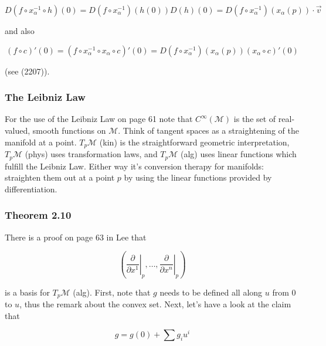 \documentclass[12pt]{article}
\begin{document}
\begin{equation}
  \label{eq:baijoofe}
  D(f\circ{}x_{\alpha}^{-1}\circ{}h)(0)=D(f\circ{}x_{\alpha}^{-1})(h(0))D(h)(0)=D(f\circ{}x_{\alpha}^{-1})(x_{\alpha}(p))\cdot\vec{v}
\end{equation}

and also

\begin{equation}
  \label{eq:aongivoo}
  (f\circ{}c)'(0)=(f\circ{}x_{\alpha}^{-1}\circ{}x_{\alpha}\circ{}c)'(0)=D(f\circ{}x_{\alpha}^{-1})(x_{\alpha}(p))(x_{\alpha}\circ{}c)'(0)
\end{equation}

(see (2207)). 

\subsubsection{The Leibniz Law}
\label{subsubsection:eelahbao}

For the use of the Leibniz Law on page 61 note that
$C^{\infty}(\mathcal{M})$ is the set of real-valued, smooth functions
on $\mathcal{M}$. Think of tangent spaces as a straightening of the
manifold at a point. $T_{p}\mathcal{M}$ (kin) is the straightforward
geometric interpretation, $T_{p}\mathcal{M}$ (phys) uses
transformation laws, and $T_{p}\mathcal{M}$ (alg) uses linear
functions which fulfill the Leibniz Law. Either way it's conversion
therapy for manifolds: straighten them out at a point $p$ by using the
linear functions provided by differentiation.

\subsubsection{Theorem 2.10}
\label{subsubsection:eengoroo}

There is a proof on page 63 in Lee that 

\begin{equation}
  \label{eq:eisaanou}
  \left(\left.\frac{\partial}{\partial{}x^{1}}\right\vert_{p},\ldots,\left.\frac{\partial}{\partial{}x^{n}}\right\vert_{p}\right)
\end{equation}

is a basis for $T_{p}\mathcal{M}$ (alg). First, note that $g$ needs to
be defined all along $u$ from $0$ to $u$, thus the remark about the
convex set. Next, let's have a look at the claim that

\begin{equation}
  \label{eq:seenithe}
  g=g(0)+\sum{}g_{i}u^{i}
\end{equation}
\end{document}
